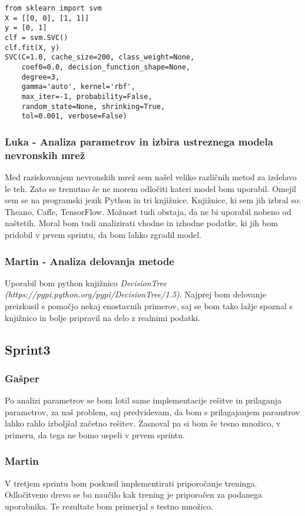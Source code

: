 \documentclass[a4paper,11pt]{article}
\begin{document}
\begin{lstlisting}[caption={Uporaba SVM v Pythonu},captionpos=b]
from sklearn import svm
X = [[0, 0], [1, 1]]
y = [0, 1]
clf = svm.SVC()
clf.fit(X, y)  
SVC(C=1.0, cache_size=200, class_weight=None, 
	coef0=0.0, decision_function_shape=None, 
	degree=3,
    gamma='auto', kernel='rbf',
    max_iter=-1, probability=False, 
    random_state=None, shrinking=True,
    tol=0.001, verbose=False)
\end{lstlisting}

\subsubsection{Luka - Analiza parametrov in izbira ustreznega modela nevronskih mrež}
Med raziskovanjem nevronskih mrež sem našel veliko različnih metod za izdelavo le teh. Zato se trenutno še ne morem odločiti kateri model bom uporabil. Omejil sem se na programski jezik Python in tri knjižnice. Knjižnice, ki sem jih izbral so: Theano, Caffe, TensorFlow. Možnost tudi obstaja, da ne bi uporabil nobeno od naštetih. Moral bom tudi analizirati vhodne in izhodne podatke, ki jih bom pridobil v prvem sprintu, da bom lahko zgradil model.

\subsubsection{Martin - Analiza delovanja metode}
Uporabil bom python knjižnico \textit{DecisionTree (https://pypi.python.org/pypi/DecisionTree/1.5)}. Najprej bom delovanje preizkusil s pomočjo nekaj enostavnih primerov, saj se bom tako lažje spoznal s knjižnico in bolje pripravil na delo z realnimi podatki.

\subsection{Sprint3}
\subsubsection{Gašper}
Po analizi parametrov se bom lotil same implementacije rešitve in prilaganja parametrov, za naš problem, saj predvidevam, da bom s prilagajanjem paramtrov lahko rahlo izboljšal začetno rešitev. Zasnoval pa si bom še tesno množico, v primeru, da tega ne bomo uspeli v prvem sprintu.
\subsubsection{Martin}
V tretjem sprintu bom poskusil implementirati priporočanje treninga. Odločitveno drevo se bo naučilo kak trening je priporočen za podanega uporabnika. Te rezultate bom primerjal s testno množico. 
\end{document}

